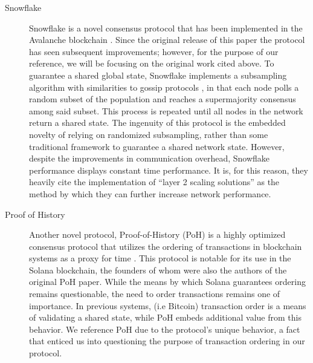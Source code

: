 \begin{description}
\item[Snowflake] Snowflake is a novel consensus protocol that has been implemented in the Avalanche blockchain \cite{Rocket2018} \cite{allavena2005correctness}. Since the original release of this paper the protocol has seen subsequent improvements; however, for the purpose of our reference, we will be focusing on the original work cited above. To guarantee a shared global state, Snowflake implements a subsampling algorithm with similarities to gossip protocols \cite{allavena2005correctness}, in that each node polls a random subset of the population and reaches a supermajority consensus among said subset. This process is repeated until all nodes in the network return a shared state. The ingenuity of this protocol is the embedded novelty of relying on randomized subsampling, rather than some traditional framework to guarantee a shared network state. However, despite the improvements in communication overhead, Snowflake performance displays constant time performance. It is, for this reason, they heavily cite the implementation of “layer 2 scaling solutions” as the method by which they can further increase network performance.

\item[Proof of History] Another novel protocol, Proof-of-History (PoH) is a highly optimized consensus protocol that utilizes the ordering of transactions in blockchain systems as a proxy for time \cite{yakovenko2018solana}. This protocol is notable for its use in the Solana blockchain, the founders of whom were also the authors of the original PoH paper. While the means by which Solana guarantees ordering remains questionable, the need to order transactions remains one of importance. In previous systems, (i.e Bitcoin) transaction order is a means of validating a shared state, while PoH embeds additional value from this behavior. We reference PoH due to the protocol’s unique behavior, a fact that enticed us into questioning the purpose of transaction ordering in our protocol.
\end{description}
